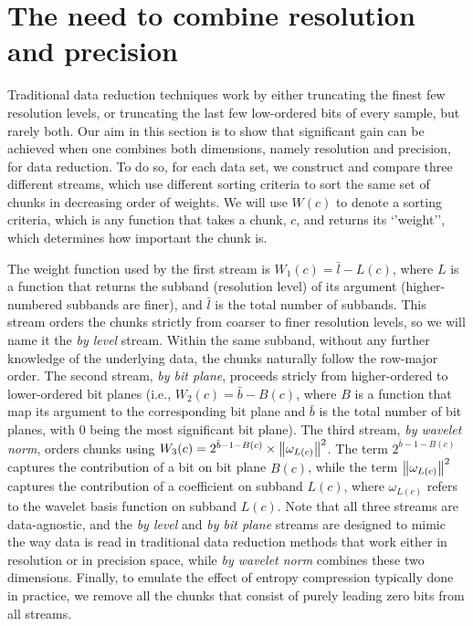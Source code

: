 \section{The need to combine resolution and precision}
\label{sec:motivation}

Traditional data reduction techniques work by either truncating the finest few resolution levels, or
truncating the last few low-ordered bits of every sample, but rarely both. Our aim in this section
is to show that significant gain can be achieved when one combines both dimensions, namely
resolution and precision, for data reduction. To do so, for each data set, we construct and compare
three different streams, which use different sorting criteria to sort the same set of chunks in
decreasing order of weights. We will use $W(c)$ to denote a sorting criteria, which is any function
that takes a chunk, $c$, and returns its `'weight'', which determines how important the chunk is.

The weight function used by the first stream is $W_1(c)=\bar{l}-L(c)$, where $L$ is a function that
returns the subband (resolution level) of its argument (higher-numbered subbands are finer), and
$\bar{l}$ is the total number of subbands. This stream orders the chunks strictly from coarser to
finer resolution levels, so we will name it the \emph{by level} stream. Within the same subband,
without any further knowledge of the underlying data, the chunks naturally follow the row-major
order. The second stream, \emph{by bit plane}, proceeds stricly from higher-ordered to lower-ordered
bit planes (i.e., $W_2(c)=\bar{b}-B(c)$, where $B$ is a function that map its argument to the
corresponding bit plane and $\bar{b}$ is the total number of bit planes, with $0$ being the most
significant bit plane). The third stream, \emph{by wavelet norm}, orders chunks using
$W_3(c)=2^{\bar{b}-1-B(c)}\times \left\lVert\omega_{L(c)}\right\rVert^2$. The term $2^{\bar{b}-1-B(c)}$ captures the
contribution of a bit on bit plane $B(c)$, while the term $\left\lVert\omega_{L(c)}\right\rVert^2$ captures the
contribution of a coefficient on subband $L(c)$, where $\omega_{L(c)}$ refers to the wavelet basis
function on subband $L(c)$. Note that all three streams are data-agnostic, and the \emph{by level}
and \emph{by bit plane} streams are designed to mimic the way data is read in traditional data
reduction methods that work either in resolution or in precision space, while \emph{by wavelet norm}
combines these two dimensions. Finally, to emulate the effect of entropy compression typically done
in practice, we remove all the chunks that consist of purely leading zero bits from all streams.

